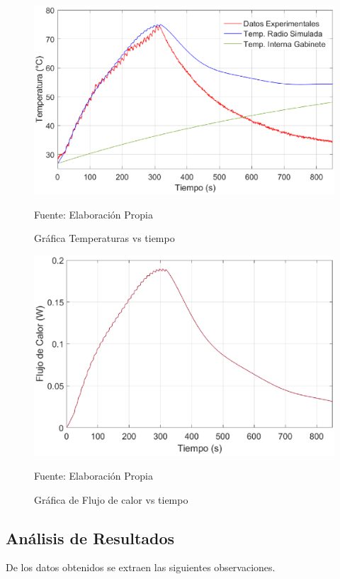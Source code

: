 \begin{figure}[H]
\centering
\includegraphics[scale=0.7]{Figuras/Gabinete_T.eps}
\caption{Gráfica Temperaturas vs tiempo}
Fuente: Elaboración Propia \label{gabinete t}
\end{figure}

\begin{figure}[H]
\centering
\includegraphics[scale=0.75]{Figuras/Gabinete_Q.eps}
\caption{Gráfica de Flujo de calor vs tiempo}
Fuente: Elaboración Propia \label{gabinete q}
\end{figure}

\subsection{Análisis de Resultados}

De los datos obtenidos se extraen las siguientes observaciones.

